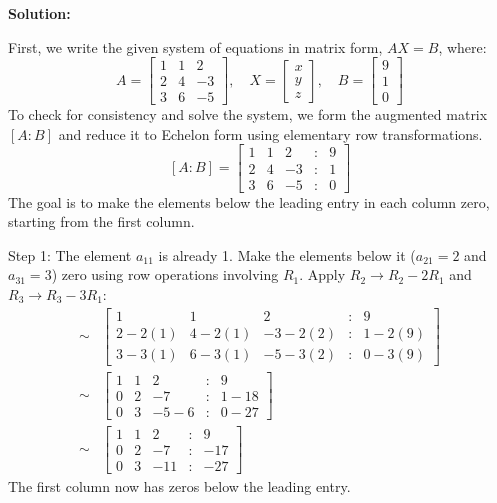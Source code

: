 \documentclass{article}
\begin{document}
\textbf{Solution:}

First, we write the given system of equations in matrix form, $AX = B$, where:
\[ A = \begin{bmatrix} 1 & 1 & 2 \\ 2 & 4 & -3 \\ 3 & 6 & -5 \end{bmatrix}, \quad X = \begin{bmatrix} x \\ y \\ z \end{bmatrix}, \quad B = \begin{bmatrix} 9 \\ 1 \\ 0 \end{bmatrix} \]
To check for consistency and solve the system, we form the augmented matrix $[A:B]$ and reduce it to Echelon form using elementary row transformations.
\[ [A:B] = \begin{bmatrix} 1 & 1 & 2 & : & 9 \\ 2 & 4 & -3 & : & 1 \\ 3 & 6 & -5 & : & 0 \end{bmatrix} \]
The goal is to make the elements below the leading entry in each column zero, starting from the first column.

Step 1: The element $a_{11}$ is already 1. Make the elements below it ($a_{21}=2$ and $a_{31}=3$) zero using row operations involving $R_1$.
Apply $R_2 \to R_2 - 2R_1$ and $R_3 \to R_3 - 3R_1$:
\begin{align*} \sim &\begin{bmatrix} 1 & 1 & 2 & : & 9 \\ 2 - 2(1) & 4 - 2(1) & -3 - 2(2) & : & 1 - 2(9) \\ 3 - 3(1) & 6 - 3(1) & -5 - 3(2) & : & 0 - 3(9) \end{bmatrix} \\ \sim &\begin{bmatrix} 1 & 1 & 2 & : & 9 \\ 0 & 2 & -7 & : & 1 - 18 \\ 0 & 3 & -5 - 6 & : & 0 - 27 \end{bmatrix} \\ \sim &\begin{bmatrix} 1 & 1 & 2 & : & 9 \\ 0 & 2 & -7 & : & -17 \\ 0 & 3 & -11 & : & -27 \end{bmatrix}\end{align*}
The first column now has zeros below the leading entry.
\end{document}
